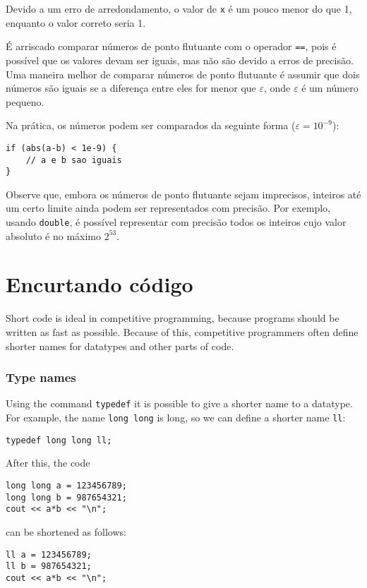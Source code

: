 Devido a um erro de arredondamento, o valor de \texttt{x} é um pouco menor do que 1, enquanto o valor correto seria 1.

É arriscado comparar números de ponto flutuante com o operador \texttt{==}, pois é possível que os valores devam ser iguais, mas não são devido a erros de precisão. Uma maneira melhor de comparar números de ponto flutuante é assumir que dois números são iguais se a diferença entre eles for menor que $\varepsilon$, onde $\varepsilon$ é um número pequeno.

Na prática, os números podem ser comparados da seguinte forma ($\varepsilon=10^{-9}$):

\begin{lstlisting}
if (abs(a-b) < 1e-9) {
    // a e b sao iguais
}
\end{lstlisting}

Observe que, embora os números de ponto flutuante sejam imprecisos, inteiros até um certo limite ainda podem ser representados com precisão. Por exemplo, usando \texttt{double}, é possível representar com precisão todos os inteiros cujo valor absoluto é no máximo $2^{53}$.

\section{Encurtando código}

Short code is ideal in competitive programming,
because programs should be written
as fast as possible.
Because of this, competitive programmers often define
shorter names for datatypes and other parts of code.

\subsubsection{Type names}
Using the command \texttt{typedef}
it is possible to give a shorter name
to a datatype.
For example, the name \texttt{long long} is long,
so we can define a shorter name \texttt{ll}:
\begin{lstlisting}
typedef long long ll;
\end{lstlisting}
After this, the code
\begin{lstlisting}
long long a = 123456789;
long long b = 987654321;
cout << a*b << "\n";
\end{lstlisting}
can be shortened as follows:
\begin{lstlisting}
ll a = 123456789;
ll b = 987654321;
cout << a*b << "\n";
\end{lstlisting}

